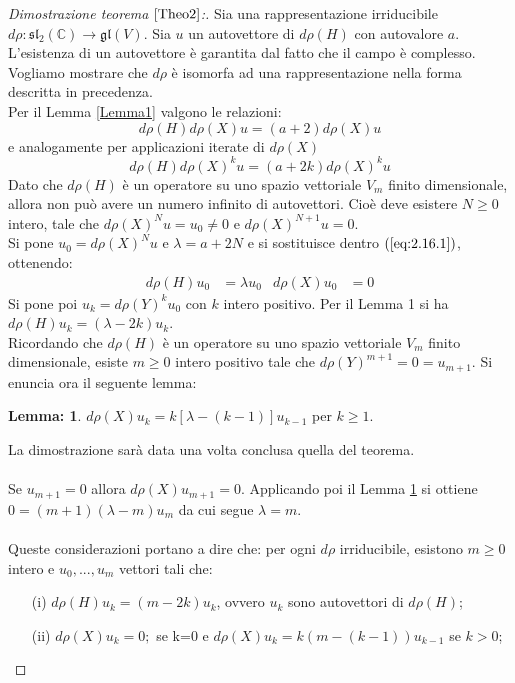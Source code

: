 \documentclass[12pt,a4paper]{report}
\theoremstyle{definition}
\theoremstyle{Theorem}
\theoremstyle{definition}
\theoremstyle{definition}
\newtheorem{Lem}[Def]{Lemma:}
\theoremstyle{definition}
\begin{document}
\begin{proof}[Dimostrazione teorema $\ref{Theo2}$:]
	Sia una rappresentazione irriducibile $d\rho:\mathfrak{sl_2(\mathbb{C})}\rightarrow \mathfrak{gl}(V)$. Sia $u$ un autovettore di $d\rho(H)$ con autovalore $a$. L'esistenza di un autovettore è garantita dal fatto che il campo è complesso. Vogliamo mostrare che $d\rho$ è isomorfa ad una rappresentazione nella forma descritta in precedenza.\\
	Per il Lemma \ref{Lemma1} valgono le relazioni: $$d\rho(H)d\rho(X)u=(a+2)d\rho(X)u$$ e analogamente per applicazioni iterate di $d\rho(X)$
	\begin{equation}
		\label{eq:2.16.1}
		d\rho(H)d\rho(X)^ku=(a+2k)d\rho(X)^ku
		\tag{1}
	\end{equation}
	Dato che $d\rho(H)$ è un operatore su uno spazio vettoriale $V_m$ finito dimensionale, allora non può avere un numero infinito di autovettori. Cioè deve esistere $N\geq 0$ intero, tale che $d\rho(X)^Nu=u_0\neq0$ e $d\rho(X)^{N+1}u=0$.\\
	Si pone $u_0=d\rho(X)^Nu$ e $\lambda=a+2N$ e si sostituisce dentro $(\ref{eq:2.16.1})$, ottenendo: 
	\begin{align*}
		d\rho(H)u_0&=\lambda u_0 & d\rho(X)u_0&=0
	\end{align*} 
	Si pone poi $u_k=d\rho(Y)^ku_0$ con $k$ intero positivo. Per il Lemma 1 si ha $d\rho(H)u_k=(\lambda-2k)u_k$.\\
	Ricordando che $d\rho(H)$ è un operatore su uno spazio vettoriale $V_m$ finito dimensionale, esiste $m\geq0$ intero positivo tale che  $d\rho(Y)^{m+1}=0=u_{m+1}$. Si enuncia ora il seguente lemma:
	\begin{Lem}\label{Lemma2}
		$d\rho(X)u_k=k[\lambda-(k-1)]u_{k-1}$ per $k\geq 1$.
	\end{Lem} 
La dimostrazione sarà data una volta conclusa quella del teorema.\\
\\Se $u_{m+1}=0$ allora $d\rho(X)u_{m+1}=0$. Applicando poi il Lemma \ref{Lemma2} si ottiene $0=(m+1)(\lambda-m)u_m$ da cui segue $\lambda=m$.\\
\\
	Queste considerazioni portano a dire che: per ogni $d\rho $ irriducibile, esistono $m\geq0$ intero e $u_0,...,u_m$ vettori tali che:\begin{itemize}
		\item[(i)] $d\rho(H)u_k=(m-2k)u_k$, ovvero $u_k$ sono autovettori di $d\rho(H)$;
		\item[(ii)] $d\rho(X)u_k=0;$ se k=0 e $d\rho(X)u_k=k(m-(k-1))u_{k-1}$ se $k>0$;

\end{itemize}
\end{proof}
\end{document}
